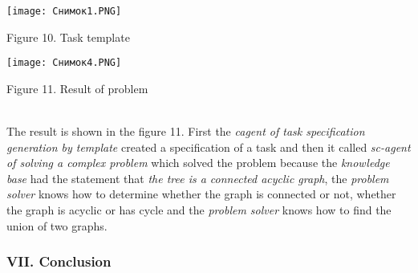\documentclass [11pt, a4paper]{article}
\begin{document}
\setlength{\parskip}{0.05cm}
\begin{multicols}{2}

\begin{minipage}{.5\textwidth}
\texttt{[image: Снимок1.PNG]}
\begin{center}
    \caption{\footnotesize{Figure 10. Task template}}
\end{center}

\end{minipage}
\begin{center}
\begin{minipage}{.5\textwidth}
\texttt{[image: Снимок4.PNG]}

\begin{center}
    \caption{\footnotesize{Figure 11. Result of problem}}
    
\end{center}

\end{minipage}
\end{center}

\par
\\\quad The result is shown in the figure 11. First the \textit{cagent of task specification generation by template} created a specification of a task and then it called \textit{sc-agent of
solving a complex problem} which solved the problem because the \textit{knowledge base} had the statement that \textit{the tree is a connected acyclic graph}, the \textit{problem solver}
knows how to determine whether the graph is connected or not, whether the graph is acyclic or has cycle and
the \textit{problem solver} knows how to find the union of two graphs.

\begin{center}
     \subsubsection*{\textnormal{VII. Conclusion}}
\end{center}
  

\end{multicols}
\end{document}
